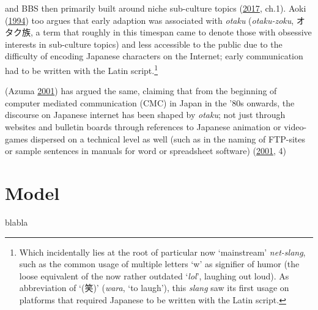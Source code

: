 \documentclass[10pt,british,A4paper,,openany]{memoir}
\begin{document}
and BBS then primarily built around niche sub-culture topics
(\protect\hyperlink{ref-barubora_eng:_2017}{2017}, ch.1). Aoki
(\protect\hyperlink{ref-aoki_virtual_1994}{1994}) too argues that early
adaption was associated with \emph{otaku} (\emph{otaku-zoku}, オタク族,
a term that roughly in this timespan came to denote those with obsessive
interests in sub-culture topics) and less accessible to the public due
to the difficulty of encoding Japanese characters on the Internet; early
communication had to be written with the Latin script.\footnote{Which
  incidentally lies at the root of particular now `mainstream'
  \emph{net-slang}, such as the common usage of multiple letters `w' as
  signifier of humor (the loose equivalent of the now rather outdated
  `\emph{lol}', laughing out loud). As abbreviation of `(笑)'
  (\emph{wara}, `to laugh'), this \emph{slang} saw its first usage on
  platforms that required Japanese to be written with the Latin script.}

(Azuma \protect\hyperlink{ref-azuma_otaku:_2001}{2001}) has argued the
same, claiming that from the beginning of computer mediated
communication (CMC) in Japan in the '80s onwards, the discourse on
Japanese internet has been shaped by \emph{otaku}; not just through
websites and bulletin boards through references to Japanese animation or
video-games dispersed on a technical level as well (such as in the
naming of FTP-sites or sample sentences in manuals for word or
spreadsheet software) (\protect\hyperlink{ref-azuma_otaku:_2001}{2001},
4)

\section{Model}\label{model}

blabla

\begin{table}[!htb]
\footnotesize
\centering
\setlength{\tabcolsep}{5pt}
\caption{Model of Cyber-Nationalism Applied to Netto-Uyoku}\label{tab:modelcybernationalism}
\end{table}
\end{document}
